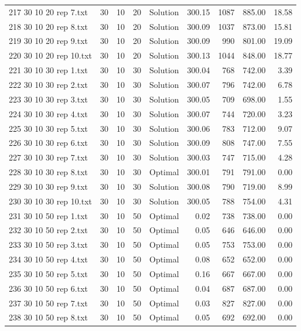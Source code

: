 \begin{longtable}{lrrllrrrr}
217 30 10 20 rep 7.txt & 30 & 10 & 20 & Solution & 300.15 & 1087 & 885.00 & 18.58\\
218 30 10 20 rep 8.txt & 30 & 10 & 20 & Solution & 300.09 & 1037 & 873.00 & 15.81\\
219 30 10 20 rep 9.txt & 30 & 10 & 20 & Solution & 300.09 & 990 & 801.00 & 19.09\\
220 30 10 20 rep 10.txt & 30 & 10 & 20 & Solution & 300.13 & 1044 & 848.00 & 18.77\\
221 30 10 30 rep 1.txt & 30 & 10 & 30 & Solution & 300.04 & 768 & 742.00 &  3.39\\
222 30 10 30 rep 2.txt & 30 & 10 & 30 & Solution & 300.07 & 796 & 742.00 &  6.78\\
223 30 10 30 rep 3.txt & 30 & 10 & 30 & Solution & 300.05 & 709 & 698.00 &  1.55\\
224 30 10 30 rep 4.txt & 30 & 10 & 30 & Solution & 300.07 & 744 & 720.00 &  3.23\\
225 30 10 30 rep 5.txt & 30 & 10 & 30 & Solution & 300.06 & 783 & 712.00 &  9.07\\
226 30 10 30 rep 6.txt & 30 & 10 & 30 & Solution & 300.09 & 808 & 747.00 &  7.55\\
227 30 10 30 rep 7.txt & 30 & 10 & 30 & Solution & 300.03 & 747 & 715.00 &  4.28\\
228 30 10 30 rep 8.txt & 30 & 10 & 30 & Optimal & 300.01 & 791 & 791.00 &  0.00\\
229 30 10 30 rep 9.txt & 30 & 10 & 30 & Solution & 300.08 & 790 & 719.00 &  8.99\\
230 30 10 30 rep 10.txt & 30 & 10 & 30 & Solution & 300.05 & 788 & 754.00 &  4.31\\
231 30 10 50 rep 1.txt & 30 & 10 & 50 & Optimal &  0.02 & 738 & 738.00 &  0.00\\
232 30 10 50 rep 2.txt & 30 & 10 & 50 & Optimal &  0.05 & 646 & 646.00 &  0.00\\
233 30 10 50 rep 3.txt & 30 & 10 & 50 & Optimal &  0.05 & 753 & 753.00 &  0.00\\
234 30 10 50 rep 4.txt & 30 & 10 & 50 & Optimal &  0.08 & 652 & 652.00 &  0.00\\
235 30 10 50 rep 5.txt & 30 & 10 & 50 & Optimal &  0.16 & 667 & 667.00 &  0.00\\
236 30 10 50 rep 6.txt & 30 & 10 & 50 & Optimal &  0.04 & 687 & 687.00 &  0.00\\
237 30 10 50 rep 7.txt & 30 & 10 & 50 & Optimal &  0.03 & 827 & 827.00 &  0.00\\
238 30 10 50 rep 8.txt & 30 & 10 & 50 & Optimal &  0.05 & 692 & 692.00 &  0.00\\

\end{longtable}
